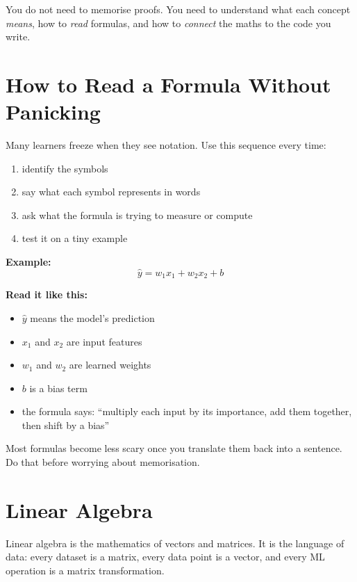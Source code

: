 \documentclass[12pt, a4paper, oneside]{book}
\begin{document}
\begin{notebox}
You do not need to memorise proofs. You need to understand what each concept \emph{means}, how to \emph{read} formulas, and how to \emph{connect} the maths to the code you write.
\end{notebox}

\section{How to Read a Formula Without Panicking}

Many learners freeze when they see notation. Use this sequence every time:
\begin{enumerate}[leftmargin=2em]
    \item identify the symbols
    \item say what each symbol represents in words
    \item ask what the formula is trying to measure or compute
    \item test it on a tiny example
\end{enumerate}

\textbf{Example:}
\[
\hat{y} = w_1x_1 + w_2x_2 + b
\]

\textbf{Read it like this:}
\begin{itemize}[leftmargin=2em]
    \item $\hat{y}$ means the model's prediction
    \item $x_1$ and $x_2$ are input features
    \item $w_1$ and $w_2$ are learned weights
    \item $b$ is a bias term
    \item the formula says: ``multiply each input by its importance, add them together, then shift by a bias''
\end{itemize}

\begin{intuitionbox}
Most formulas become less scary once you translate them back into a sentence. Do that before worrying about memorisation.
\end{intuitionbox}

\section{Linear Algebra}

Linear algebra is the mathematics of vectors and matrices. It is the language of data: every dataset is a matrix, every data point is a vector, and every ML operation is a matrix transformation.
\end{document}
